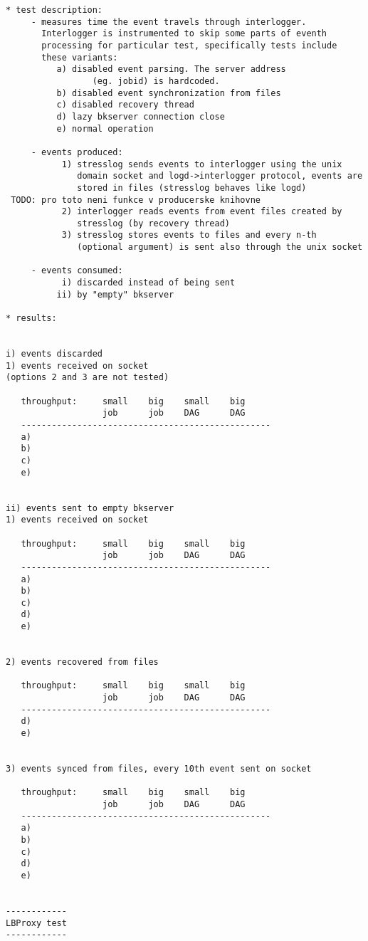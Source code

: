 \documentclass{egee}
\begin{document}
\begin{verbatim}
* test description:
     - measures time the event travels through interlogger.
       Interlogger is instrumented to skip some parts of eventh
       processing for particular test, specifically tests include
       these variants: 
	      a) disabled event parsing. The server address
                 (eg. jobid) is hardcoded.
	      b) disabled event synchronization from files
	      c) disabled recovery thread
	      d) lazy bkserver connection close
	      e) normal operation

     - events produced:
           1) stresslog sends events to interlogger using the unix
              domain socket and logd->interlogger protocol, events are
              stored in files (stresslog behaves like logd)
 TODO: pro toto neni funkce v producerske knihovne
           2) interlogger reads events from event files created by
              stresslog (by recovery thread)
           3) stresslog stores events to files and every n-th
              (optional argument) is sent also through the unix socket

     - events consumed:
           i) discarded instead of being sent
          ii) by "empty" bkserver

* results:


i) events discarded
1) events received on socket
(options 2 and 3 are not tested)

   throughput:     small    big    small    big 
                   job      job    DAG      DAG 
   -------------------------------------------------
   a)
   b)
   c)
   e)


ii) events sent to empty bkserver 
1) events received on socket

   throughput:     small    big    small    big 
                   job      job    DAG      DAG 
   -------------------------------------------------
   a)
   b)
   c)
   d)
   e)


2) events recovered from files

   throughput:     small    big    small    big 
                   job      job    DAG      DAG 
   -------------------------------------------------
   d)
   e)


3) events synced from files, every 10th event sent on socket

   throughput:     small    big    small    big 
                   job      job    DAG      DAG 
   -------------------------------------------------
   a)
   b)
   c)
   d)
   e)


------------
LBProxy test
------------


\end{verbatim}
\end{document}
